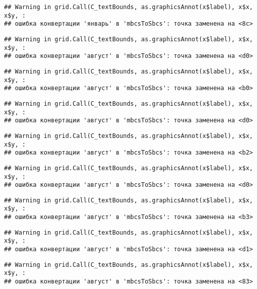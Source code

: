 \documentclass[
]{article}
\begin{document}
\begin{verbatim}
## Warning in grid.Call(C_textBounds, as.graphicsAnnot(x$label), x$x, x$y, :
## ошибка конвертации 'январь' в 'mbcsToSbcs': точка заменена на <8c>
\end{verbatim}

\begin{verbatim}
## Warning in grid.Call(C_textBounds, as.graphicsAnnot(x$label), x$x, x$y, :
## ошибка конвертации 'август' в 'mbcsToSbcs': точка заменена на <d0>
\end{verbatim}

\begin{verbatim}
## Warning in grid.Call(C_textBounds, as.graphicsAnnot(x$label), x$x, x$y, :
## ошибка конвертации 'август' в 'mbcsToSbcs': точка заменена на <b0>
\end{verbatim}

\begin{verbatim}
## Warning in grid.Call(C_textBounds, as.graphicsAnnot(x$label), x$x, x$y, :
## ошибка конвертации 'август' в 'mbcsToSbcs': точка заменена на <d0>
\end{verbatim}

\begin{verbatim}
## Warning in grid.Call(C_textBounds, as.graphicsAnnot(x$label), x$x, x$y, :
## ошибка конвертации 'август' в 'mbcsToSbcs': точка заменена на <b2>
\end{verbatim}

\begin{verbatim}
## Warning in grid.Call(C_textBounds, as.graphicsAnnot(x$label), x$x, x$y, :
## ошибка конвертации 'август' в 'mbcsToSbcs': точка заменена на <d0>
\end{verbatim}

\begin{verbatim}
## Warning in grid.Call(C_textBounds, as.graphicsAnnot(x$label), x$x, x$y, :
## ошибка конвертации 'август' в 'mbcsToSbcs': точка заменена на <b3>
\end{verbatim}

\begin{verbatim}
## Warning in grid.Call(C_textBounds, as.graphicsAnnot(x$label), x$x, x$y, :
## ошибка конвертации 'август' в 'mbcsToSbcs': точка заменена на <d1>
\end{verbatim}

\begin{verbatim}
## Warning in grid.Call(C_textBounds, as.graphicsAnnot(x$label), x$x, x$y, :
## ошибка конвертации 'август' в 'mbcsToSbcs': точка заменена на <83>
\end{verbatim}
\end{document}
